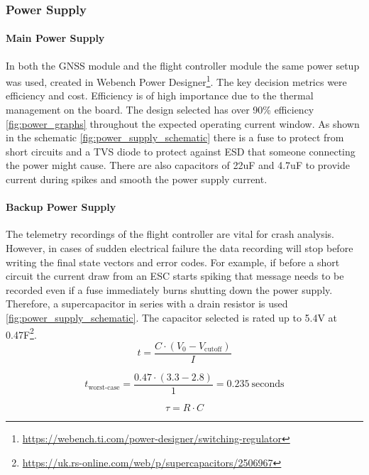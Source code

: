 \subsubsection{Power Supply}\label{sub_sub_section:tgt_power_supply}

\paragraph{Main Power Supply}
In both the GNSS module and the flight controller module the same power setup was used, created in Webench Power Designer\footnote{\url{https://webench.ti.com/power-designer/switching-regulator}}. The key decision metrics were efficiency and cost.  Efficiency is of high importance due to the thermal management on the board. The design selected has over 90\% efficiency \ref{fig:power_graphs} throughout the expected operating current window. As shown in the schematic \ref{fig:power_supply_schematic} there is a fuse to protect from short circuits and a \gls{TVS} diode to protect against \gls{ESD} that someone connecting the power might cause. There are also capacitors of 22uF and 4.7uF to provide current during spikes and smooth the power supply current.

\paragraph{Backup Power Supply}
The telemetry recordings of the flight controller are vital for crash analysis. However, in cases of sudden electrical failure the data recording will stop before writing the final state vectors and error codes. For example, if before a short circuit the current draw from an \gls{ESC} starts spiking that message needs to be recorded even if a fuse immediately burns shutting down the power supply. Therefore, a supercapacitor in series with a drain resistor is used \ref{fig:power_supply_schematic}. The capacitor selected is rated up to 5.4V at 0.47F\footnote{\url{https://uk.rs-online.com/web/p/supercapacitors/2506967}}. 
\begin{equation}
t = \frac{C \cdot (V_0 - V_{\text{cutoff}})}{I}
\label{eq:discharge_time}
\end{equation}

\begin{equation}
t_{\text{worst-case}} = \frac{0.47 \cdot (3.3 - 2.8)}{1} = 0.235\ \text{seconds}
\label{eq:worst_case_time}
\end{equation}

\begin{equation}
\tau = R \cdot C
\label{eq:charging_time_constant}
\end{equation}

